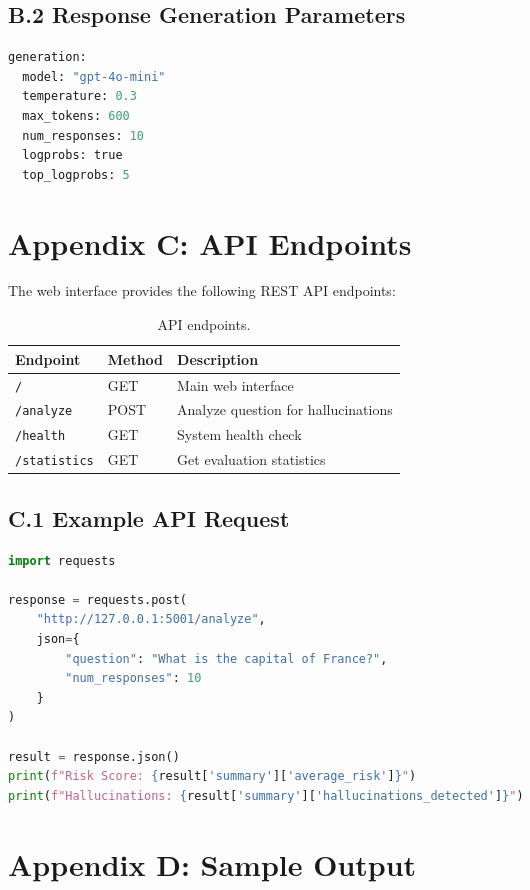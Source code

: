 \subsection*{B.2 Response Generation Parameters}

\begin{lstlisting}[language=Python, caption={LLM query configuration}]
generation:
  model: "gpt-4o-mini"
  temperature: 0.3
  max_tokens: 600
  num_responses: 10
  logprobs: true
  top_logprobs: 5
\end{lstlisting}

\section*{Appendix C: API Endpoints}

The web interface provides the following REST API endpoints:

\begin{table}[!htbp]
\centering
\caption{API endpoints.}
\begin{tabular}{lll}
\toprule
Endpoint & Method & Description \\
\midrule
\texttt{/} & GET & Main web interface \\
\texttt{/analyze} & POST & Analyze question for hallucinations \\
\texttt{/health} & GET & System health check \\
\texttt{/statistics} & GET & Get evaluation statistics \\
\bottomrule
\end{tabular}
\end{table}

\subsection*{C.1 Example API Request}

\begin{lstlisting}[language=Python, caption={Example analysis request}]
import requests

response = requests.post(
    "http://127.0.0.1:5001/analyze",
    json={
        "question": "What is the capital of France?",
        "num_responses": 10
    }
)

result = response.json()
print(f"Risk Score: {result['summary']['average_risk']}")
print(f"Hallucinations: {result['summary']['hallucinations_detected']}")
\end{lstlisting}

\section*{Appendix D: Sample Output}

